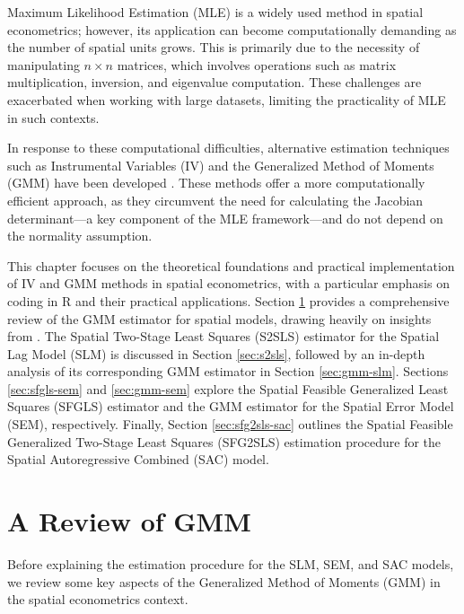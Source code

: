 \documentclass[english,12pt]{book}\usepackage[]{graphicx}\usepackage[]{xcolor}
\begin{document}
Maximum Likelihood Estimation (MLE) is a widely used method in spatial econometrics; however, its application can become computationally demanding as the number of spatial units grows. This is primarily due to the necessity of manipulating $n \times n$ matrices, which involves operations such as matrix multiplication, inversion, and eigenvalue computation. These challenges are exacerbated when working with large datasets, limiting the practicality of MLE in such contexts.

In response to these computational difficulties, alternative estimation techniques such as Instrumental Variables (IV) and the Generalized Method of Moments (GMM) have been developed \citep{kelejian1998generalized, kelejian1999generalized, lee2007gmm}.  These methods offer a more computationally efficient approach, as they circumvent the need for calculating the Jacobian determinant---a key component of the MLE framework---and do not depend on the normality assumption.

This chapter focuses on the theoretical foundations and practical implementation of IV and GMM methods in spatial econometrics, with a particular emphasis on coding in R and their practical applications. Section \ref{sec:gmm-review} provides a comprehensive review of the GMM estimator for spatial models, drawing heavily on insights from \cite{pruchaHB}. The Spatial Two-Stage Least Squares (S2SLS) estimator for the Spatial Lag Model (SLM) is discussed in Section \ref{sec:s2sls}, followed by an in-depth analysis of its corresponding GMM estimator in Section \ref{sec:gmm-slm}. Sections \ref{sec:sfgls-sem} and \ref{sec:gmm-sem} explore the Spatial Feasible Generalized Least Squares (SFGLS) estimator and the GMM estimator for the Spatial Error Model (SEM), respectively. Finally, Section \ref{sec:sfg2sls-sac} outlines the Spatial Feasible Generalized Two-Stage Least Squares (SFG2SLS) estimation procedure for the Spatial Autoregressive Combined (SAC) model.


\section{A Review of GMM}\label{sec:gmm-review}

Before explaining the estimation procedure for the SLM, SEM, and SAC models, we review some key aspects of the Generalized Method of Moments (GMM) in the spatial econometrics context.
\end{document}
